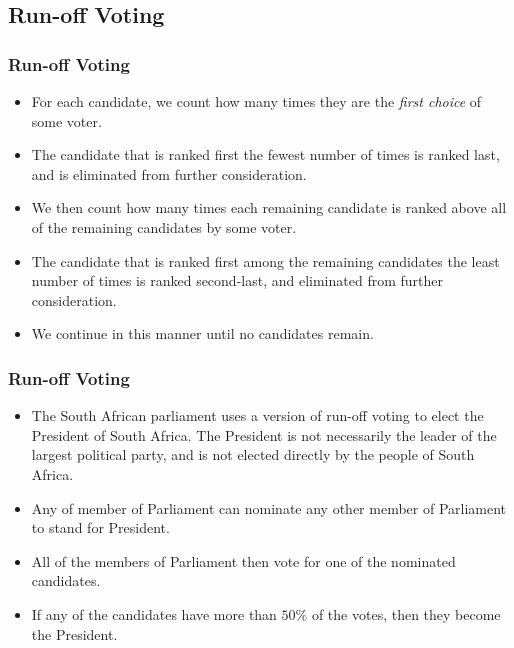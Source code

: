\documentclass{beamer}
\begin{document}
    \subsection{Run-off Voting}
    \begin{frame}
        \frametitle{Run-off Voting}
    
        \begin{itemize}
            \item For each candidate, we count how many times they are the \emph{first choice} of some voter. \pause
            \item The candidate that is ranked first the fewest number of times is ranked last, and is eliminated from further consideration. \pause
            \item We then count how many times each remaining candidate is ranked above all of the remaining candidates by some voter. \pause
            \item The candidate that is ranked first among the remaining candidates the least number of times is ranked second-last, and eliminated from further consideration. \pause
            \item We continue in this manner until no candidates remain.
        \end{itemize}
    
    \end{frame}
    \begin{frame}
        \frametitle{Run-off Voting}
    
        \begin{itemize}
            \item The South African parliament uses a version of run-off voting to elect the President of South Africa. The President is \alert{not} necessarily the leader of the largest political party, and is not elected directly by the people of South Africa. \pause
            \item Any of member of Parliament can nominate any other member of Parliament to stand for President. \pause
            \item All of the members of Parliament then vote for one of the nominated candidates. \pause
            \item If any of the candidates have more than $50\%$ of the votes, then they become the President.
        \end{itemize}
    
    \end{frame}
\end{document}
